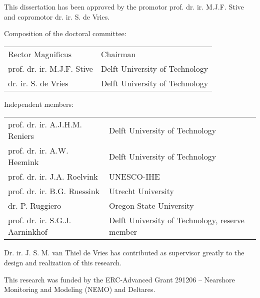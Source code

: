 \thispagestyle{empty}

\hfill

\vfill

\noindent This dissertation has been approved by the promotor
prof. dr. ir. M.J.F. Stive and copromotor dr. ir. S. de Vries.

\bigskip

\noindent Composition of the doctoral committee:

\begin{table}[h]
  \begin{tabular}{p{5cm} l}
    Rector Magnificus               & Chairman \\
    prof. dr. ir. M.J.F. Stive      & Delft University of Technology \\
    dr. ir. S. de Vries             & Delft University of Technology \\
  \end{tabular}
\end{table}

\noindent Independent members:

\begin{table}[h]
  \begin{tabular}{p{5cm} l}
    prof. dr. ir. A.J.H.M. Reniers  & Delft University of Technology \\
    prof. dr. ir. A.W. Heemink      & Delft University of Technology \\
    prof. dr. ir. J.A. Roelvink     & UNESCO-IHE \\
    prof. dr. ir. B.G. Ruessink     & Utrecht University \\
    dr. P. Ruggiero                 & Oregon State University \\
    prof. dr. ir. S.G.J. Aarninkhof & Delft University of Technology, reserve member \\
  \end{tabular}
\end{table}

\vfill

\noindent Dr. ir. J. S. M. van Thiel de Vries has contributed as
supervisor greatly to the design and realization of this research.

\bigskip

\noindent This research was funded by the ERC-Advanced Grant 291206 --
Nearshore Monitoring and Modeling (NEMO) and Deltares.

